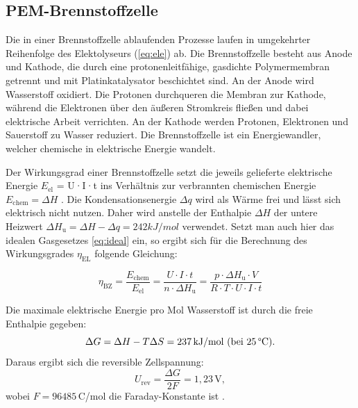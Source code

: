 \documentclass[11pt,a4paper]{article}
\numberwithin{equation}{section}
\begin{document}
\subsection{PEM-Brennstoffzelle}
Die in einer Brennstoffzelle ablaufenden Prozesse laufen in umgekehrter Reihenfolge des Elektolyseurs (\ref{eq:ele}) ab. Die Brennstoffzelle besteht aus Anode und Kathode, die durch eine protonenleitfähige, gasdichte Polymermembran getrennt und mit Platinkatalysator beschichtet sind. An der Anode wird Wasserstoff oxidiert. Die Protonen durchqueren die Membran zur Kathode, während die Elektronen 
über den äußeren Stromkreis fließen und dabei elektrische Arbeit verrichten. An der Kathode werden Protonen, Elektronen und Sauerstoff zu Wasser reduziert.
Die Brennstoffzelle ist ein Energiewandler, welcher chemische in elektrische Energie wandelt. %


\noindent Der Wirkungsgrad einer Brennstoffzelle setzt die jeweils gelieferte elektrische Energie $E_{\text{el}}$ = U·I·t ins Verhältnis zur
verbrannten chemischen Energie $E_{\text{chem}} =  \Delta H$ . Die Kondensationsenergie $\Delta q$ wird als W\"arme frei und l\"asst sich elektrisch nicht nutzen. Daher wird anstelle der Enthalpie $\Delta H$ der untere Heizwert $\Delta H_{\text{u}} = \Delta H - \Delta q = 242kJ/mol$ verwendet. \newline
Setzt man auch hier das idealen Gasgesetzes \ref{eq:ideal} ein, so ergibt sich f\"ur die Berechnung des Wirkungsgrades $\eta_{\text{EL}}$ folgende Gleichung:

\begin{equation}
\eta_\text{BZ} = \frac{E_\text{chem}}{E_\text{el}} = \frac{U \cdot I \cdot t}{n \cdot \Delta H_{\text{u}}} = \frac{p \cdot \Delta H_{\text{u}} \cdot V}{R \cdot T \cdot U \cdot I \cdot t} 
\label{eq:wirkungBZ}
\end{equation}
\newline 

\noindent Die maximale elektrische Energie pro Mol Wasserstoff ist durch die freie Enthalpie gegeben:
\begin{equation}
\Delta G = \Delta H - T \Delta S = 237\,\text{kJ/mol (bei 25\,\textdegree C)}.
\end{equation}
Daraus ergibt sich die reversible Zellspannung:
\begin{equation}
U_\text{rev} = \frac{\Delta G}{2F} = 1{,}23\,\text{V},
\end{equation}
wobei $F = 96485$\,C/mol die Faraday-Konstante ist \cite{4}.
\end{document}
